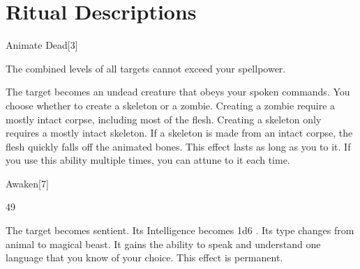 \section{Ritual Descriptions}
\begin{spellsection}{Animate Dead}[3]
\begin{spellheader}
\end{spellheader}
\begin{spellcontent}
\begin{spelltargetinginfo}
\spellspecial The combined levels of all targets cannot exceed your spellpower.
\end{spelltargetinginfo}
\begin{spelleffects}
\spelleffect
The target becomes an undead creature that obeys your spoken commands.
You choose whether to create a skeleton or a zombie.
Creating a zombie require a mostly intact corpse, including most of the flesh.
Creating a skeleton only requires a mostly intact skeleton.
If a skeleton is made from an intact corpse, the flesh quickly falls off the animated bones.
This effect lasts as long as you  to it.
If you use this ability multiple times, you can attune to it each time.
\end{spelleffects}
\end{spellcontent}
\begin{spellfooter}
\end{spellfooter}
\begin{spellsubcontent}
\end{spellsubcontent}
\end{spellsection}
\begin{spellsection}{Awaken}[7]
\begin{spellcontent}
\begin{spelltargetinginfo}
 49
\end{spelltargetinginfo}
\begin{spelleffects}
\spelleffect
The target becomes sentient.
Its Intelligence becomes 1d6 .
Its type changes from animal to magical beast.
It gains the ability to speak and understand one language that you know of your choice.
This effect is permanent.
\end{spelleffects}
\end{spellcontent}
\begin{spellfooter}
\end{spellfooter}
\begin{spellsubcontent}
\end{spellsubcontent}
\end{spellsection}
